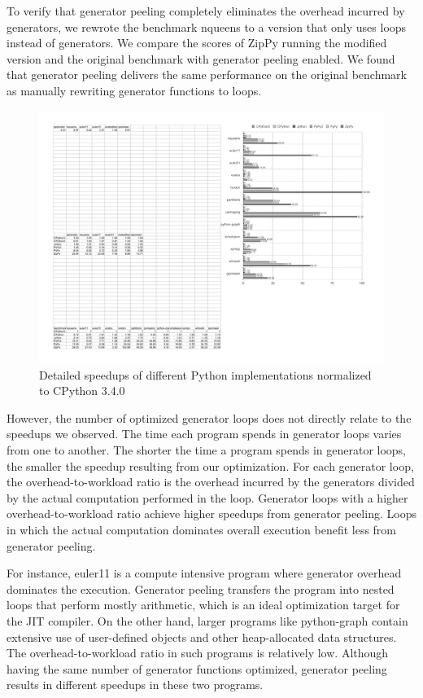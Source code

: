 To verify that generator peeling completely eliminates the overhead incurred by generators, we rewrote the benchmark \textsf{nqueens} to a version that only uses loops instead of generators.
We compare the scores of ZipPy running the modified version and the original benchmark with generator peeling enabled.
We found that generator peeling delivers the same performance on the original benchmark as manually rewriting generator functions to loops.

\begin{figure}
\centering
\includegraphics[scale=.58, page=2]{benchmarks/generator-peeling-benchmark-chart}
\caption{Detailed speedups of different Python implementations normalized to CPython 3.4.0}
\label{fig:ch6-generator-benchmark-zippy-speedup}
\end{figure}

However, the number of optimized generator loops does not directly relate to the speedups we observed.
The time each program spends in generator loops varies from one to another.
The shorter the time a program spends in generator loops, the smaller the speedup resulting from our optimization.
For each generator loop, the overhead-to-workload ratio is the overhead incurred by the generators divided by the actual computation performed in the loop.
Generator loops with a higher overhead-to-workload ratio achieve higher speedups from generator peeling.
Loops in which the actual computation dominates overall execution benefit less from generator peeling.

For instance, \textsf{euler11} is a compute intensive program where generator overhead dominates the execution.
Generator peeling transfers the program into nested loops that perform mostly arithmetic, which is an ideal optimization target for the JIT compiler.
On the other hand, larger programs like \textsf{python-graph} contain extensive use of user-defined objects and other heap-allocated data structures.
The overhead-to-workload ratio in such programs is relatively low.
Although having the same number of generator functions optimized, generator peeling results in different speedups in these two programs.

